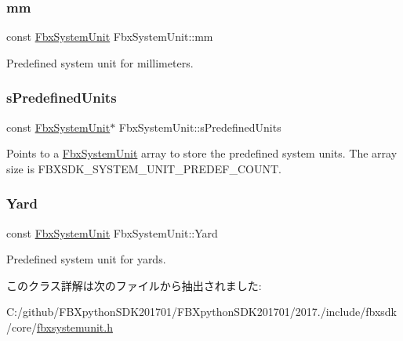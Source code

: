 \subsubsection{\texorpdfstring{mm}{mm}}
{\footnotesize\ttfamily const \hyperlink{class_fbx_system_unit}{Fbx\+System\+Unit} Fbx\+System\+Unit\+::mm\hspace{0.3cm}{\ttfamily [static]}}



Predefined system unit for millimeters. 

\mbox{\label{class_fbx_system_unit_a5a63e7dec80be27c252a24739a710505}} 
\subsubsection{\texorpdfstring{s\+Predefined\+Units}{sPredefinedUnits}}
{\footnotesize\ttfamily const \hyperlink{class_fbx_system_unit}{Fbx\+System\+Unit}$\ast$ Fbx\+System\+Unit\+::s\+Predefined\+Units\hspace{0.3cm}{\ttfamily [static]}}



Points to a \hyperlink{class_fbx_system_unit}{Fbx\+System\+Unit} array to store the predefined system units. The array size is F\+B\+X\+S\+D\+K\+\_\+\+S\+Y\+S\+T\+E\+M\+\_\+\+U\+N\+I\+T\+\_\+\+P\+R\+E\+D\+E\+F\+\_\+\+C\+O\+U\+NT. 

\mbox{\label{class_fbx_system_unit_a4c9612d5387f7ac06a313efd63452cd4}} 
\subsubsection{\texorpdfstring{Yard}{Yard}}
{\footnotesize\ttfamily const \hyperlink{class_fbx_system_unit}{Fbx\+System\+Unit} Fbx\+System\+Unit\+::\+Yard\hspace{0.3cm}{\ttfamily [static]}}



Predefined system unit for yards. 



このクラス詳解は次のファイルから抽出されました\+:\begin{DoxyCompactItemize}
\item 
C\+:/github/\+F\+B\+Xpython\+S\+D\+K201701/\+F\+B\+Xpython\+S\+D\+K201701/2017./include/fbxsdk/core/\hyperlink{fbxsystemunit_8h}{fbxsystemunit.\+h}\end{DoxyCompactItemize}
